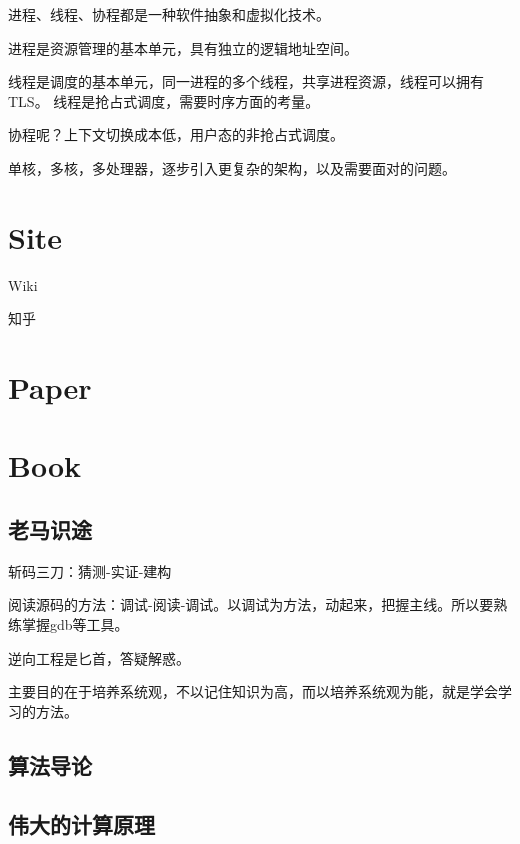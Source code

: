 进程、线程、协程都是一种软件抽象和虚拟化技术。

进程是资源管理的基本单元，具有独立的逻辑地址空间。

线程是调度的基本单元，同一进程的多个线程，共享进程资源，线程可以拥有TLS。
线程是抢占式调度，需要时序方面的考量。

协程呢？上下文切换成本低，用户态的非抢占式调度。

单核，多核，多处理器，逐步引入更复杂的架构，以及需要面对的问题。


\section{Site}

\begin{enumbox}
\item Wiki
\item 知乎
\end{enumbox}

\section{Paper}

\section{Book}

\subsection{老马识途}

斩码三刀：猜测-实证-建构

阅读源码的方法：调试-阅读-调试。以调试为方法，动起来，把握主线。所以要熟练掌握gdb等工具。

逆向工程是匕首，答疑解惑。

主要目的在于培养系统观，不以记住知识为高，而以培养系统观为能，就是学会学习的方法。

\subsection{算法导论}

\subsection{伟大的计算原理}

